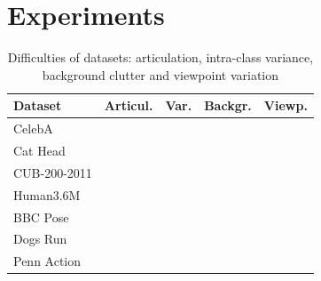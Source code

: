 \chapter{Experiments}
%
\begin{table}
	\centering
	\caption{Difficulties of datasets: articulation, intra-class variance, background clutter and viewpoint variation}
	\label{tab:challenges}
	\begin{tabular}{l|rrrr}
		Dataset &  Articul.& Var. &  Backgr.& Viewp.  \\ \hline
		CelebA &   &  &  &    \\
		Cat Head & &  \checkmark&  &   \\
		CUB-200-2011 & & \checkmark& \checkmark&   \\
		Human3.6M &\checkmark& &  & \checkmark  \\
		BBC Pose &  \checkmark&  & \checkmark&  \\
		Dogs Run & \checkmark& \checkmark& \checkmark&   \\
		Penn Action & \checkmark& \checkmark& \checkmark& \checkmark\\
	\end{tabular}
\end{table}
%

